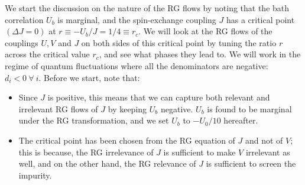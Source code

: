\documentclass[reprint,superscriptaddress,floatfix]{revtex4-2}
\begin{document}
We start the discussion on the nature of the RG flows by noting that the bath correlation \(U_b\) is marginal, and the spin-exchange coupling \(J\) has a critical point \(\left( \Delta J = 0 \right) \) at \(r \equiv -U_b/J = 1/4 \equiv r_c\). We will look at the RG flows of the couplings \(U,V\) and \(J\) on both sides of this critical point by tuning the ratio \(r\) across the critical value \(r_c\), and see what phases they lead to. We will work in the regime of quantum fluctuations where all the denominators are negative: \(d_i < 0 ~\forall~i\). Before we start, note that:
\begin{itemize}
	\item Since \(J\) is positive, this means that we can capture both relevant and irrelevant RG flows of \(J\) by keeping \(U_b\) negative. \(U_b\) is found to be marginal under the RG transformation, and we set \(U_b\) to \(-U_0/10\) hereafter.
	\item The critical point has been chosen from the RG equation of \(J\) and not of \(V\); this is because, the RG irrelevance of \(J\) is sufficient to make \(V\) irrelevant as well, and on the other hand, the RG relevance of \(J\) is sufficient to screen the impurity.
\end{itemize}
  
\end{document}
